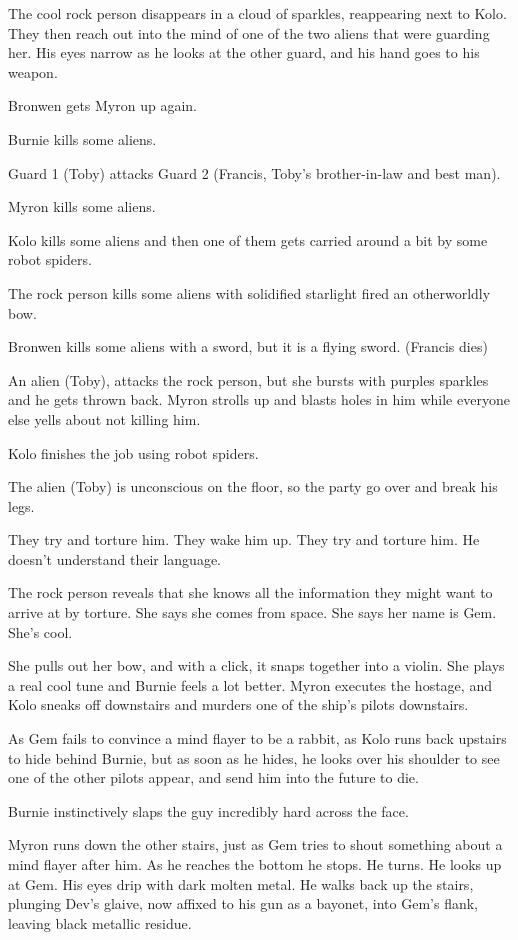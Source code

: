 The cool rock person disappears in a cloud of sparkles, reappearing next to Kolo. They then reach out into the mind of one of the two aliens that were guarding her. His eyes narrow as he looks at the other guard, and his hand goes to his weapon.\medskip

Bronwen gets Myron up again.\medskip

Burnie kills some aliens.\medskip

Guard 1 (Toby) attacks Guard 2 (Francis, Toby’s brother-in-law and best man).\medskip

Myron kills some aliens.\medskip

Kolo kills some aliens and then one of them gets carried around a bit by some robot spiders.\medskip

The rock person kills some aliens with solidified starlight fired an otherworldly bow.\medskip

Bronwen kills some aliens with a sword, but it is a flying sword. (Francis dies)\medskip

An alien (Toby), attacks the rock person, but she bursts with purples sparkles and he gets thrown back. Myron strolls up and blasts holes in him while everyone else yells about not killing him.\medskip

Kolo finishes the job using robot spiders.\medskip

The alien (Toby) is unconscious on the floor, so the party go over and break his legs.\medskip

They try and torture him. They wake him up. They try and torture him. He doesn’t understand their language.\medskip

The rock person reveals that she knows all the information they might want to arrive at by torture. She says she comes from space. She says her name is Gem. She’s cool.\medskip

She pulls out her bow, and with a click, it snaps together into a violin. She plays a real cool tune and Burnie feels a lot better. Myron executes the hostage, and Kolo sneaks off downstairs and murders one of the ship’s pilots downstairs.\medskip

As Gem fails to convince a mind flayer to be a rabbit, as Kolo runs back upstairs to hide behind Burnie, but as soon as he hides, he looks over his shoulder to see one of the other pilots appear, and send him into the future to die.\medskip

Burnie instinctively slaps the guy incredibly hard across the face.\medskip

Myron runs down the other stairs, just as Gem tries to shout something about a mind flayer after him. As he reaches the bottom he stops. He turns. He looks up at Gem. His eyes drip with dark molten metal. He walks back up the stairs, plunging Dev’s glaive, now affixed to his gun as a bayonet, into Gem’s flank, leaving black metallic residue.\medskip

